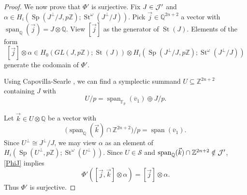 \documentclass[11pt,letterpaper]{amsart}
\DeclareMathOperator{\Span}{span}
\DeclareMathOperator{\Sp}{Sp}
\newcommand{\cS}{\mathcal{S}}\newcommand{\cT}{\mathcal{T}}
\newcommand{\F}{\mathbb{F}}
\newcommand{\Z}{\mathbb{Z}}
\newcommand{\Q}{\mathbb{Q}}
\numberwithin{theoremcounter}{section}
\theoremstyle{definition}
\theoremstyle{remark}
\DeclareMathOperator{\St}{St}
\begin{document}
\begin{proof}
We now prove that $\Phi'$ is surjective. Fix $J \in \mathcal{J}'$ and $\alpha \in H_i(\Sp(J^\perp/J,p\Z); \St^\omega(J^\perp/J))$. Pick $\vec j \in \Q^{2n+2}$ a vector with $\Span_\Q(\vec j)=J \otimes \Q$. View $[\vec j]$ as the generator of $\St(J)$. Elements of the form $$[\vec j] \otimes \alpha \in H_0(GL(J,p\Z);\St(J)) \otimes H_i(\Sp(J^\perp/J,p\Z);\St^\omega(J^\perp/J))$$ generate the codomain of $\Phi'$.

Using Capovilla-Searle \cite[Lemma 4.5]{Fabio}, we can find a symplectic summand $U \subseteq \Z^{2n+2}$  containing $J$ with $$U/p=\Span_{\F_p}(\overline v_1) \oplus J/p.$$ 

Let $\vec k \in U \otimes \Q$ be a vector with $$\Big(\Span_\Q(\vec k) \cap \Z^{2n+2}\Big)/p=\Span(\overline v_1).$$ Since $U^\perp \cong J^\perp/J$, we may view $\alpha$ as an element of $H_i(\Sp(U^\perp,p\Z); \St^\omega(U^\perp))$. Since $U \in \cS $ and $\Span_\Q(\vec k) \cap \Z^{2n+2} \notin \cJ'$, \autoref{PhiJ} implies 
$$\Phi'([\vec j,\vec k] \otimes \alpha)=[\vec j]\otimes \alpha.$$ Thus $\Phi'$ is surjective. 
\end{proof}










\end{document}
